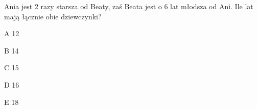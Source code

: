 \begin{tresc}
Ania jest 2 razy starsza od Beaty, zaś Beata jest o 6 lat młodsza od Ani. Ile lat mają łącznie obie dziewczynki?
\end{tresc}
\begin{wariant}{A} 12 \end{wariant}
\begin{wariant}{B} 14 \end{wariant}
\begin{wariant}{C} 15 \end{wariant}
\begin{wariant}{D} 16 \end{wariant}
\begin{wariant}{E} 18 \end{wariant}
